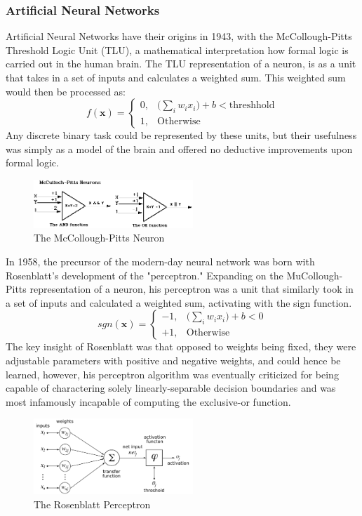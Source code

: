 \documentclass[letterpaper]{article}
\begin{document}
\subsubsection{Artificial Neural Networks}
Artificial Neural Networks have their origins in 1943, with the McCollough-Pitts Threshold Logic Unit (TLU), a mathematical interpretation how formal logic is carried out in the human brain\cite{mcculloch_pitts_1943}.
The TLU representation of a neuron, is as a unit that takes in a set of inputs and calculates a weighted sum. This weighted sum 
would then be processed as:
\[ 
	f(\mathbf{x}) = \begin{cases}
		0,& \big(\sum\limits_{i}w_ix_i\big) + b < \text{threshhold}\\
		1,  &\text{Otherwise}
		\end{cases}
\]
Any discrete binary task could be represented by these units, but their usefulness was simply as a model of the brain and offered no deductive 
improvements upon formal logic.
\begin{figure}[H]
	\centering
	\includegraphics[width=6cm]{mpneuron.png}
	\caption{The McCollough-Pitts Neuron\cite{luger_2009}}
\end{figure}
\par
In 1958, the precursor of the modern-day neural network was born with Rosenblatt's development of the "perceptron."
Expanding on the MuCollough-Pitts representation of a neuron, his perceptron was a unit that similarly took in a set of inputs and calculated a weighted sum, activating with the sign function.  
\[ 
	sgn(\mathbf{x}) = \begin{cases}
		-1,& \big(\sum\limits_{i}w_ix_i\big) + b < 0\\
		+1,  &\text{Otherwise}
		\end{cases}
\]
The key insight of Rosenblatt was that opposed to weights being fixed, they were adjustable parameters with positive and negative weights, and could 
hence be learned, however, his perceptron algorithm\cite{rosenblatt} was eventually criticized for being capable of charactering solely
linearly-separable decision boundaries and was most infamously incapable of computing the exclusive-or function.
\begin{figure}[H]
	\centering
	\includegraphics[width=6cm]{Rosenblattperceptron.png}
	\caption{The Rosenblatt Perceptron\cite{mitchell_1997}}
\end{figure}
\end{document}
